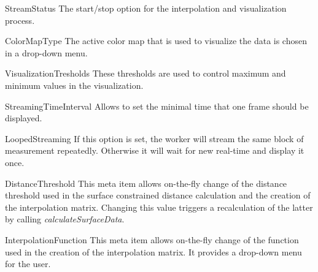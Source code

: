\begin{aims}
	\item[\hspace*{11mm} StreamStatus] The start/stop option for the interpolation and visualization process.
\end{aims}

\begin{aims}
	\item[\hspace*{11mm} ColorMapType] The active color map that is used to visualize the data is chosen in a drop-down menu.
\end{aims}

\begin{aims}
	\item[\hspace*{11mm} VisualizationTresholds] These thresholds are used to control maximum and minimum values in the visualization.
\end{aims}

\begin{aims}
	\item[\hspace*{11mm} StreamingTimeInterval] Allows to set the minimal time that one frame should be displayed.
\end{aims}

\begin{aims}
	\item[\hspace*{11mm} LoopedStreaming] If this option is set, the worker will stream the same block of measurement repeatedly. Otherwise it will wait for new real-time and display it once.
\end{aims}

\begin{aims}
	\item[\hspace*{11mm} DistanceThreshold] This meta item allows on-the-fly change of the distance threshold used in the surface constrained distance calculation and the creation of the interpolation matrix. Changing this value triggers a recalculation of the latter by calling \textit{calculateSurfaceData}.
\end{aims}

\begin{aims}
	\item[\hspace*{11mm} InterpolationFunction] This meta item allows on-the-fly change of the function used in the creation of the interpolation matrix. It provides a drop-down menu for the user.
\end{aims}

